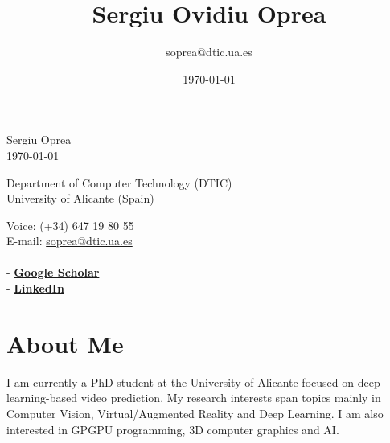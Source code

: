 \documentclass[8pt]{article}
\title{\bfseries\Huge Sergiu Ovidiu Oprea}
\author{soprea@dtic.ua.es}
\date{\today}
\begin{document}
\begin{center}
	\Huge Sergiu Oprea\\
	\Large \today
\end{center}
\bigskip
\begin{minipage}[ht]{0.65\textwidth}
Department of Computer Technology (DTIC)\\
University of Alicante (Spain)\\
\end{minipage}
\hfill
\begin{minipage}[ht]{0.3\textwidth}
Voice: (+34) 647 19 80 55\\
E-mail: \href{mailto:soprea@dtic.ua.es}{soprea@dtic.ua.es}\\
\\
- \href{https://scholar.google.es/citations?user=JlZbbzIAAAAJ&hl=es}{\textbf{Google Scholar}}\\
- \href{https://www.linkedin.com/in/sergiu-oprea-12babaa9/}{\textbf{LinkedIn}}
\end{minipage}
 
\section*{About Me}

I am currently a PhD student at the University of Alicante focused on deep learning-based video prediction. My research interests span topics mainly in Computer Vision, Virtual/Augmented Reality and Deep Learning. I am also interested in GPGPU programming, 3D computer graphics and AI.
\end{document}

